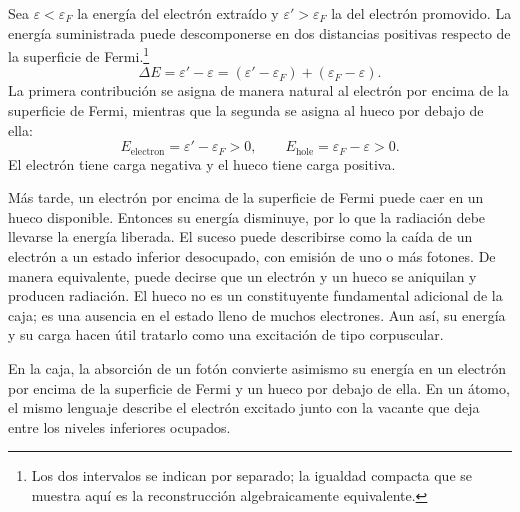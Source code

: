 Sea \(\varepsilon<\varepsilon_F\) la energía del electrón extraído y \(\varepsilon'>\varepsilon_F\) la del electrón promovido. La energía suministrada puede descomponerse en dos distancias positivas respecto de la superficie de Fermi.\footnote{Los dos intervalos se indican por separado; la igualdad compacta que se muestra aquí es la reconstrucción algebraicamente equivalente.}
\begin{equation}
\Delta E
=\varepsilon'-\varepsilon
=(\varepsilon'-\varepsilon_F)+(\varepsilon_F-\varepsilon).
\end{equation}
La primera contribución se asigna de manera natural al electrón por encima de la superficie de Fermi, mientras que la segunda se asigna al hueco por debajo de ella:
\begin{equation}
E_{\mathrm{electron}}=\varepsilon'-\varepsilon_F>0,
\qquad
E_{\mathrm{hole}}=\varepsilon_F-\varepsilon>0.
\end{equation}
El electrón tiene carga negativa y el hueco tiene carga positiva.

Más tarde, un electrón por encima de la superficie de Fermi puede caer en un hueco disponible. Entonces su energía disminuye, por lo que la radiación debe llevarse la energía liberada. El suceso puede describirse como la caída de un electrón a un estado inferior desocupado, con emisión de uno o más fotones. De manera equivalente, puede decirse que un electrón y un hueco se aniquilan y producen radiación. El hueco no es un constituyente fundamental adicional de la caja; es una ausencia en el estado lleno de muchos electrones. Aun así, su energía y su carga hacen útil tratarlo como una excitación de tipo corpuscular.

\begin{classroomqa}
\end{classroomqa}

En la caja, la absorción de un fotón convierte asimismo su energía en un electrón por encima de la superficie de Fermi y un hueco por debajo de ella. En un átomo, el mismo lenguaje describe el electrón excitado junto con la vacante que deja entre los niveles inferiores ocupados.


